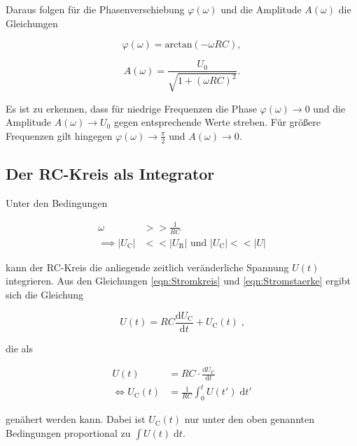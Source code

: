 Daraus folgen für die Phasenverschiebung $\varphi(\omega)$ und die Amplitude $A(\omega)$
die Gleichungen

\begin{equation}
    \varphi(\omega) = \text{arctan}(- \omega RC),
    \label{eqn:Phase}
\end{equation}

\begin{equation}
    A(\omega) = \frac{U_0}{\sqrt{1 + (\omega RC)^2}}.
    \label{eqn:Amplitude}
\end{equation}

Es ist zu erkennen, dass für niedrige Frequenzen die Phase $\varphi(\omega) \to 0$ und
die Amplitude $A(\omega) \to U_0$ gegen entsprechende Werte streben. Für größere
Frequenzen gilt hingegen $\varphi(\omega) \to \frac{\pi}{2}$ und $A(\omega) \to 0$.

\subsection{Der RC-Kreis als Integrator}

Unter den Bedingungen 

\begin{align*}
    \omega &>> \frac{1}{RC} \\
    \implies |U_\text{C}| &<< |U_\text{R}| \text{  und  } |U_\text{C}| << |U|
\end{align*}

kann der RC-Kreis die anliegende zeitlich veränderliche Spannung $U(t)$ integrieren.
Aus den Gleichungen \eqref{eqn:Stromkreis} und \eqref{eqn:Stromstaerke} ergibt sich die
Gleichung 

\begin{equation*}
    U(t) = RC \frac{\text{d}U_\text{C}}{\text{d}t} + U_\text{C}(t) \; \text{,}
\end{equation*}

die als

\begin{align*}
    U(t) &= RC \cdot \frac{\text{d}U_\text{C}}{\text{d}t} \\
    \iff U_\text{C}(t) &= \frac{1}{RC} \int^t_0 U(t') \; \text{d} t'
\end{align*}

genähert werden kann. Dabei ist $U_\text{C}(t)$ nur unter den oben genannten Bedingungen
proportional zu $\int U(t) \; \text{d}t$.

